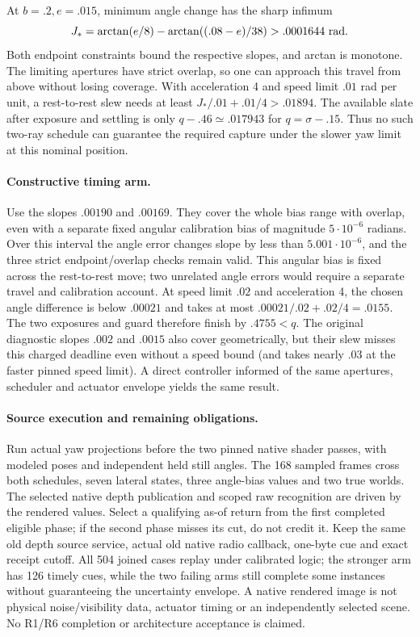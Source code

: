 \documentclass{article}
\begin{document}
At $b=.2,e=.015$, minimum angle change has the sharp infimum
\[
 J_*=\arctan(e/8)-\arctan((.08-e)/38)>.0001644\ {\rm rad}.
\]
Both endpoint constraints bound the respective slopes, and arctan
is monotone. The limiting apertures have strict overlap, so one
can approach this travel from above without losing coverage.
With acceleration 4 and speed limit $.01$ rad per unit,
a rest-to-rest slew needs at least $J_*/.01+.01/4>.01894$.
The available slate after exposure and settling is only
$q-.46\simeq .017943$ for $q=\sigma-.15$. Thus no such two-ray
schedule can guarantee the required capture under the slower
yaw limit at this nominal position.

\paragraph{Constructive timing arm.}
Use the slopes $.00190$ and $.00169$. They cover the whole
bias range with overlap, even with a separate fixed angular
calibration bias of magnitude $5\cdot 10^{-6}$ radians. Over
this interval the angle error changes slope by less than
$5.001\cdot 10^{-6}$, and the three strict endpoint/overlap
checks remain valid. This angular bias is fixed across the
rest-to-rest move; two unrelated angle errors would require
a separate travel and calibration account. At speed limit $.02$
and acceleration 4, the chosen angle difference is below $.00021$
and takes at most $.00021/.02+.02/4=.0155$.
The two exposures and guard therefore finish by $.4755<q$.
The original diagnostic slopes $.002$ and $.0015$ also cover
geometrically, but their slew misses this charged deadline even
without a speed bound (and takes nearly $.03$ at the faster
pinned speed limit). A direct controller informed of the same
apertures, scheduler and actuator envelope yields the same result.

\paragraph{Source execution and remaining obligations.}
Run actual yaw projections before the two pinned native shader
passes, with modeled poses and independent held still angles.
The 168 sampled frames cross both schedules, seven lateral states,
three angle-bias values and two true worlds. The selected native
depth publication and scoped raw recognition are driven by the
rendered values. Select a qualifying as-of return from the first
completed eligible phase; if the second phase misses its cut, do
not credit it. Keep the same old depth source service, actual
old native radio callback, one-byte cue and exact receipt cutoff.
All 504 joined cases replay under calibrated logic; the stronger
arm has 126 timely cues, while the two failing arms still complete
some instances without guaranteeing the uncertainty envelope.
A native rendered image is not physical noise/visibility data,
actuator timing or an independently selected scene. No R1/R6
completion or architecture acceptance is claimed.
\end{document}
